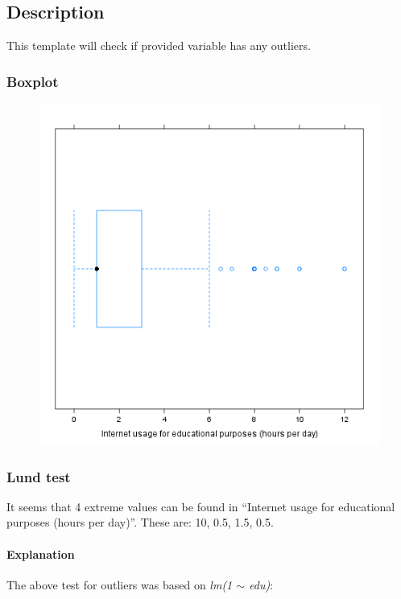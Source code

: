 \documentclass{article}
\makeatletter
\def\maxwidth{\ifdim\Gin@nat@width>\linewidth\linewidth
\else\Gin@nat@width\fi}
\let\Oldincludegraphics\includegraphics
\renewcommand{\includegraphics}[1]{\Oldincludegraphics[width=\maxwidth]{#1}}
\makeatother
\begin{document}
\subsection{Description}

This template will check if provided variable has any outliers.

\subsubsection{Boxplot}

\begin{figure}[htbp]
\centering
\includegraphics{d24b3eb41da4d1de21d4bce0e30d2e1b.png}
\caption{}
\end{figure}

\subsubsection{Lund test}

It seems that 4 extreme values can be found in ``Internet usage for
educational purposes (hours per day)''. These are: 10, 0.5, 1.5, 0.5.

\paragraph{Explanation}

The above test for outliers was based on \emph{lm(1 \ensuremath{\sim}
edu)}:
\end{document}
